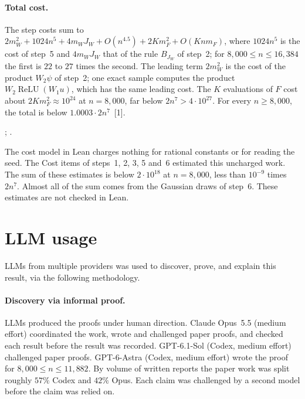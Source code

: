 \documentclass[10pt]{article}
\newcommand{\leanver}{v1.1}
\newcommand{\leanrepo}{https://github.com/andrewcritch/beating-sampling-theorem/tree/\leanver/lean/BstLean}
\newcommand{\leanmark}[1]{{\relscale{0.78}\color{gray}[#1]}}
\newenvironment{leanitems}{\par\smallskip\relscale{0.78}\color{gray}\hypersetup{urlcolor=gray}\raggedright%
  \begin{list}{}{\setlength{\leftmargin}{2em}\setlength{\labelwidth}{1.6em}%
  \setlength{\labelsep}{0.4em}\setlength{\itemsep}{0pt}\setlength{\topsep}{0pt}%
  \setlength{\parsep}{0pt}}}{\end{list}\par\medskip}
\newcommand{\relu}{\operatorname{ReLU}}
\begin{document}
\paragraph{Total cost.}
The step costs sum to $2m_W^2+1024n^5+4m_WJ_W+O(n^{4.5})+2Km_F^2+O(Knm_F)$,
where $1024n^5$ is the cost of step~5 and $4m_WJ_W$ that of the rule
$B_{J_W}$ of step~2; for $8{,}000\le n\le16{,}384$ the first is $22$ to $27$
times the second. The leading term
$2m_W^2$ is the cost of the product $W_2\psi$ of step~2; one exact sample
computes the product $W_2\relu(W_1u)$, which has the same leading cost. The $K$ evaluations of $F$ cost about
$2Km_F^2\approx10^{24}$ at $n=8{,}000$, far below $2n^7>4\cdot10^{27}$. For
every $n\ge8{,}000$, the total is below $1.0003\cdot2n^7$~\leanmark{1}.
\begin{leanitems}
; \href{\leanrepo}{\leanstepK}.
\end{leanitems}

The cost model in Lean charges nothing for rational constants or for reading
the seed. The Cost items of steps~1, 2, 3, 5 and~6 estimated this uncharged
work. The sum of these estimates is below $2\cdot10^{18}$ at $n=8{,}000$,
less than $10^{-9}$ times $2n^7$. Almost all of the sum comes from the
Gaussian draws of step~6. These estimates are not checked in Lean.

\section{LLM usage}\label{sec:llm-usage}
LLMs from multiple providers was used to discover, prove, and explain this result, via the following methodology.

\paragraph{Discovery via informal proof.}
LLMs produced the proofs under human direction. Claude Opus~5.5
(medium effort) coordinated the work, wrote and challenged paper proofs, and
checked each result before the result was recorded. GPT-6.1-Sol (Codex, medium
effort) challenged paper proofs. GPT-6-Astra (Codex, medium effort) wrote the
proof for $8{,}000\le n\le11{,}882$. By volume of written reports the paper
work was split roughly $57\%$ Codex and $42\%$ Opus. Each claim was challenged
by a second model before the claim was relied on.
\end{document}
